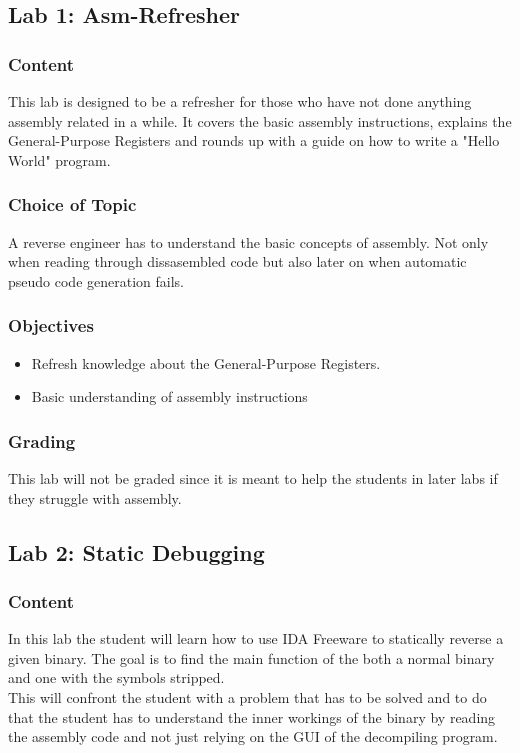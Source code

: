 
\subsection{Lab 1: Asm-Refresher}
\subsubsection*{Content}
This lab is designed to be a refresher for those who have not done anything assembly related in a while. It covers the basic assembly instructions, explains the General-Purpose Registers and rounds up with a guide on how to write a "Hello World" program.  
\subsubsection*{Choice of Topic}
A reverse engineer has to understand the basic concepts of assembly. Not only when reading through dissasembled code but also later on when automatic pseudo code generation fails.
\subsubsection*{Objectives}
\begin{itemize}
    \item Refresh knowledge about the General-Purpose Registers.
    \item Basic understanding of assembly instructions
\end{itemize}
\subsubsection*{Grading}
This lab will not be graded since it is meant to help the students in later labs if they struggle with assembly.

\subsection{Lab 2: Static Debugging}
\subsubsection*{Content}
In this lab the student will learn how to use IDA Freeware to statically reverse a given binary. The goal is to find the main function of the both a normal binary and one with the symbols stripped. \\
This will confront the student with a problem that has to be solved and to do that the student has to understand the inner workings of the binary by reading the assembly code and not just relying on the GUI of the decompiling program.
